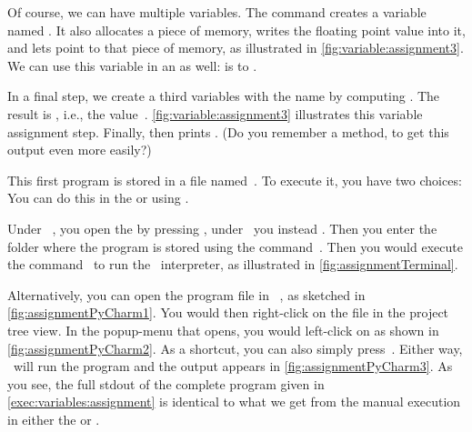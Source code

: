 Of course, we can have multiple variables.
The command  creates a variable named .
It also allocates a piece of memory, writes the floating point value  into it, and lets  point to that piece of memory, as illustrated in \cref{fig:variable:assignment3}.
We can use this variable in an  as well:
 is  to .%
%
\begin{sloppypar}%
In a final step, we create a third variables with the name  by computing .
The result is , i.e., the  value~.
\cref{fig:variable:assignment3} illustrates this variable assignment step.
Finally,  then prints .
(Do you remember a method, to get this output even more easily?)%
\end{sloppypar}%
%
This first program is stored in a file named~.
To execute it, you have two choices:
You can do this in the  or using \pycharm.%
%
\begin{sloppypar}%
Under \ubuntu\ \linux, you open the  by pressing \ubuntuTerminal, under \microsoftWindows\ you instead \windowsTerminal.
Then you enter the folder where the program  is stored using the command~.
Then you would execute the command~ to run the \python\ interpreter, as illustrated in \cref{fig:assignmentTerminal}.%
\end{sloppypar}%
%
Alternatively, you can open the program file in \pycharm\ , as sketched in \cref{fig:assignmentPyCharm1}.
You would then right-click on the file  in the project tree view.
In the popup-menu that opens, you would left-click on  as shown in \cref{fig:assignmentPyCharm2}.
As a shortcut, you can also simply press~.
Either way, \pycharm\ will run the program and the output appears in \cref{fig:assignmentPyCharm3}.
As you see, the full \acrfull{stdout} of the complete program given in \cref{exec:variables:assignment} is identical to what we get from the manual execution in either the  or \pycharm.

